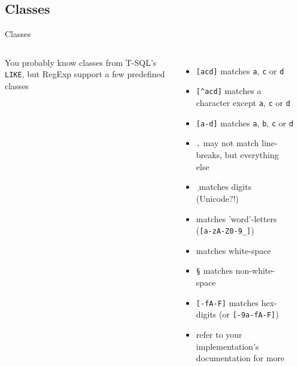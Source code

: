 \documentclass[english,aspectratio=169]{beamer}
\begin{document}
\subsection{Classes}
\begin{frame}{Classes}
\begin{columns}
        You probably know classes from T-SQL's \texttt{LIKE}, but RegExp support a few predefined classes
        \begin{itemize}
            \item \texttt{[acd]} matches \texttt{a}, \texttt{c} or \texttt{d}
            \item \texttt{[\string^acd]} matches a character except \texttt{a}, \texttt{c} or \texttt{d}
            \item \texttt{[a-d]} matches \texttt{a}, \texttt{b}, \texttt{c} or \texttt{d}
            \item \texttt{.} may\textdagger{} not match line-breaks, but everything else
            \item \texttt{\string\d} matches digits\textdagger{} (Unicode?!)
            \item \texttt{\string\w} matches 'word'-letters\textdagger{} (\texttt{[a-zA-Z0-9\_]})
            \item \texttt{\string\s} matches white-space
            \item \texttt{\string\S} matches non-white-space
            \item<2-> \texttt{[\string\da-fA-F]} matches hex-digits\textdagger{} (or \texttt{[-9a-fA-F]})
            \item<2-> refer to your implementation's documentation for more
        \end{itemize}
        \begin{center}
        \end{center}
\end{columns}
\end{frame}
\end{document}
